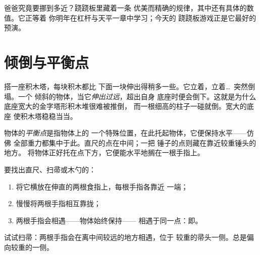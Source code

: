 \begin{remark}[一个预告]\label{rem:g2:balance-equilibrium:promise}
爸爸究竟要挪到多近？跷跷板里藏着一条
优美而精确的规律，其中还有具体的数值。它正等着
你明年在杠杆与天平一章中学习；今天的
跷跷板游戏正是它最好的预演。
\end{remark}

\section{倾倒与平衡点}

\begin{example}[倾斜过度的塔]\label{ex:g2:balance-equilibrium:tower}
搭一座积木塔，每块积木都比
下面一块伸出得稍多一些。它立着，立着\dots\ 突然倒塌。一个
倾斜的物体，当它\emph{伸出过远}，超出自身
底座时便会倒下。这就是为什么底座宽大的金字塔形积木堆很难被推倒，
而一根细高的柱子一碰就倒。宽大的底座
使积木塔稳稳当当。
\end{example}

\begin{definition}[平衡点]\label{def:g2:balance-equilibrium:point}
物体的\emph{平衡点}是指物体上的
一个特殊位置，在此托起物体，它便保持水平——仿佛
全部重力都集中于此。直尺的点在中间；一把
锤子的点则藏在靠近较重锤头的地方。
将物体正好托在点下方，它便能水平地搁在一根手指上。
\end{definition}

\begin{method}[寻找平衡点]\label{met:g2:balance-equilibrium:find}
要找出直尺、扫帚或木勺的：
\begin{enumerate}
  \item 将它横放在伸直的两根食指上，每根手指各靠近
        一端；
  \item 慢慢将两根手指相互靠拢；
  \item 两根手指会相遇——物体始终保持——
        相遇于同一点：即。
\end{enumerate}
试试扫帚：两根手指会在离中间较远的地方相遇，位于
较重的帚头一侧。总是偏向较重的一侧。
\end{method}

